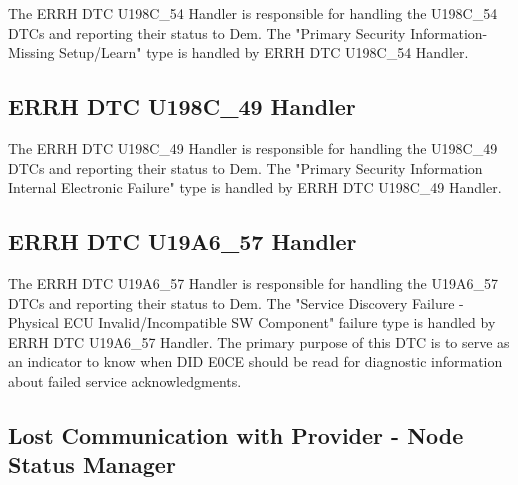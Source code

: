 The ERRH DTC U198C_54 Handler is responsible for handling the U198C_54 DTCs and reporting their status to Dem.
The "Primary Security Information-Missing Setup/Learn" type is handled by ERRH DTC U198C_54 Handler. 


{ }


\subsection{ERRH DTC U198C_49 Handler}
\label{subsec:ERRHDTCU198C49}

The ERRH DTC U198C_49 Handler is responsible for handling the U198C_49 DTCs and reporting their status to Dem.
The "Primary Security Information Internal Electronic Failure" type is handled by ERRH DTC U198C_49 Handler. 


{  }

\subsection{ERRH DTC U19A6_57 Handler}
\label{subsec:ERRHDTCU19A657}

The ERRH DTC U19A6_57 Handler is responsible for handling the U19A6_57 DTCs and reporting their status to Dem.
The "Service Discovery Failure - Physical ECU Invalid/Incompatible SW Component" failure type is handled by ERRH DTC U19A6_57 Handler. 
The primary purpose of this DTC is to serve as an indicator to know when DID E0CE should be read for diagnostic information about failed service acknowledgments.

{
    
}


{}

\subsection{Lost Communication with Provider - Node Status Manager}
